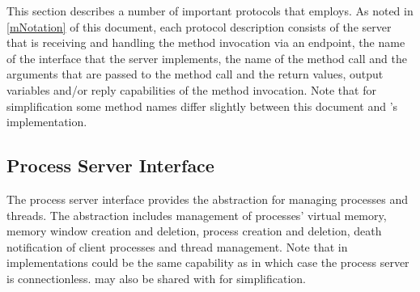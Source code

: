 This section describes a number of important protocols that  employs. As noted in \autoref{mNotation} of this document, each protocol description consists of the server that is receiving and handling the method invocation via an endpoint, the name of the interface that the server implements, the name of the method call and the arguments that are passed to the method call and the return values, output variables and/or reply capabilities of the method invocation. Note that for simplification some method names differ slightly between this document and 's implementation.

\subsection{Process Server Interface}

The process server interface provides the abstraction for managing processes and threads. The abstraction includes management of processes' virtual memory, memory window creation and deletion, process creation and deletion, death notification of client processes and thread management. Note that in implementations  could be the same capability as  in which case the process server is connectionless.  may also be shared with  for simplification.

